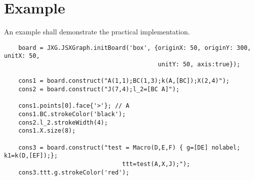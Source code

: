 \documentclass[10pt]{article}
\begin{document}
\section{Example}
An example shall demonstrate the practical implementation.
\begin{verbatim}
    board = JXG.JSXGraph.initBoard('box', {originX: 50, originY: 300, unitX: 50,
                                           unitY: 50, axis:true});

    cons1 = board.construct("A(1,1);BC(1,3);k(A,[BC]);X(2,4)");
    cons2 = board.construct("J(7,4);l_2=[BC A]");

    cons1.points[0].face{'>'}; // A
    cons1.BC.strokeColor('black');
    cons2.l_2.strokeWidth(4);
    cons1.X.size(8);

    cons3 = board.construct("test = Macro(D,E,F) { g=[DE] nolabel; k1=k(D,[EF]);};
                                 ttt=test(A,X,J);");
    cons3.ttt.g.strokeColor('red');
\end{verbatim}
\end{document}
